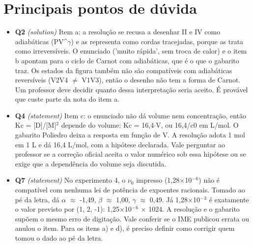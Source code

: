 \documentclass{article}%
\begin{document}
\section*{Principais pontos de dúvida}%
\begin{itemize}%
\item%
\textbf{Q2} \textit{(solution)} Item a: a resolução se recusa a desenhar II e IV como adiabáticas (PV\^{}$\gamma$) e as representa como cordas tracejadas, porque as trata como irreversíveis. O enunciado ('muito rápida', sem troca de calor) e o item b apontam para o ciclo de Carnot com adiabáticas, que é o que o gabarito traz. Os estados da figura também não são compatíveis com adiabáticas reversíveis (V2V4 $\neq$ V1V3), então o desenho não tem a forma de Carnot. Um professor deve decidir quanto dessa interpretação seria aceito. É provável que custe parte da nota do item a.%
\item%
\textbf{Q4} \textit{(statement)} Item c: o enunciado não dá volume nem concentração, então Kc = {[}D{]}/{[}M{]}$^2$ depende do volume: Kc = 16,4$\cdot$V, ou 16,4/c0 em L/mol. O gabarito Poliedro deixa a resposta em função de V. A resolução adota 1 mol em 1 L e dá 16,4 L/mol, com a hipótese declarada. Vale perguntar ao professor se a correção oficial aceita o valor numérico sob essa hipótese ou se exige que a dependência do volume seja discutida.%
\item%
\textbf{Q7} \textit{(statement)} No experimento 4, o $\nu$$_{0}$ impresso (1,28$\times$10$^{-}$$^{6}$) não é compatível com nenhuma lei de potência de expoentes racionais. Tomado ao pé da letra, dá $\alpha$ $\approx$ -1,49, $\beta$ $\approx$ 1,00, $\gamma$ $\approx$ 0,49. Já 1,28$\times$10$^{-}$$^3$ é exatamente o valor previsto por (1, 2, -1): 1,25$\times$10$^{-}$$^{6}$ $\times$ 1024. A resolução e o gabarito supõem o mesmo erro de digitação. Vale conferir se o IME publicou errata ou anulou o item. Para os itens a) e d), é preciso definir como corrigir quem tomou o dado ao pé da letra.%
\end{itemize}%
\end{document}
